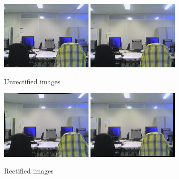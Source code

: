 \documentclass[a4paper]{article}
\begin{document}
\begin{figure}[h]
  \centering
  \includegraphics[width=0.4\textwidth]{leftown}
  \includegraphics[width=0.4\textwidth]{rightown}
  \caption{Unrectified images}
  \label{unrectified}

  \includegraphics[width=0.4\textwidth]{leftownr}
  \includegraphics[width=0.4\textwidth]{rightownr}
  \caption{Rectified images}
  \label{rectified}
\end{figure}

\newpage
\end{document}
